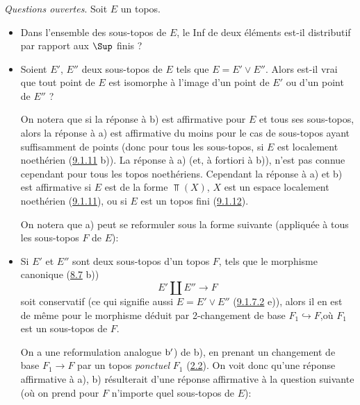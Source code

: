 \documentclass[10pt]{../fichiers-configuration-latex/smfart}
\begin{document}
\setcounter{subsubsection}{13}
\subsubsection{}
\emph{Questions ouvertes}. Soit $E$ un topos.

\begin{itemize}
\item[a)] Dans l'ensemble des sous-topos de $E$, le Inf de deux
éléments est-il distributif par rapport aux $\Sup$ finis ?

\item[b)] Soient $E'$, $E''$ deux sous-topos de $E$ tels que $E=E'\vee
E''$. Alors est-il vrai que tout point de $E$ est isomorphe à
l'image d'un point de $E'$ ou d'un point de $E''$ ?

On notera que si la réponse à b) est affirmative pour $E$ et tous
ses sous-topos, alors la réponse à a) est affirmative du moins pour
le cas de sous-topos ayant suffisamment de points (donc pour tous
les sous-topos, si $E$ est localement noethérien
(\hyperref[IV.exer9.1.11]{9.1.11} b)). La réponse à a) (et, à fortiori à b)),
n'est pas connue cependant pour tous les topos noethériens.
Cependant la réponse à a) et b) est affirmative si $E$ est de la
forme $\Top(X)$, $X$ est un espace localement noethérien
(\hyperref[IV.exer9.1.11]{9.1.11}), ou si $E$ est un topos fini
(\hyperref[IV.exer9.1.12]{9.1.12}).

On notera que a) peut se reformuler sous la forme suivante
(appliquée à tous les sous-topos $F$ de $E$):

\item[$\rm a'$)] Si $E'$ et $E''$ sont deux sous-topos d'un topos $F$,
tels que le morphisme canonique (\cf \hyperref[IV.exer8.7]{8.7} b))
\begin{equation*}
E'\amalg E''\longrightarrow F\tag{9.1.14.1}
\end{equation*}
soit conservatif (ce qui signifie aussi $E=E'\vee E''$
(\hyperref[IV.exer9.1.7.2]{9.1.7.2} e)), alors il en est de même pour le morphisme
déduit par 2-changement de base $F_1\hookrightarrow
F$,\pageoriginale où $F_1$ est un sous-topos de $F$.

On a une reformulation analogue $\rm b'$) de b), en prenant un
changement de base $F_1\rightarrow F$ par un topos \emph{ponctuel}
$F_1$ (\hyperref[IV.subsec2.2]{2.2}). On voit donc qu'une réponse affirmative
à a), b) résulterait d'une réponse affirmative à la question
suivante (où on prend pour $F$ n'importe quel sous-topos de $E$):


\end{itemize}
\end{document}
